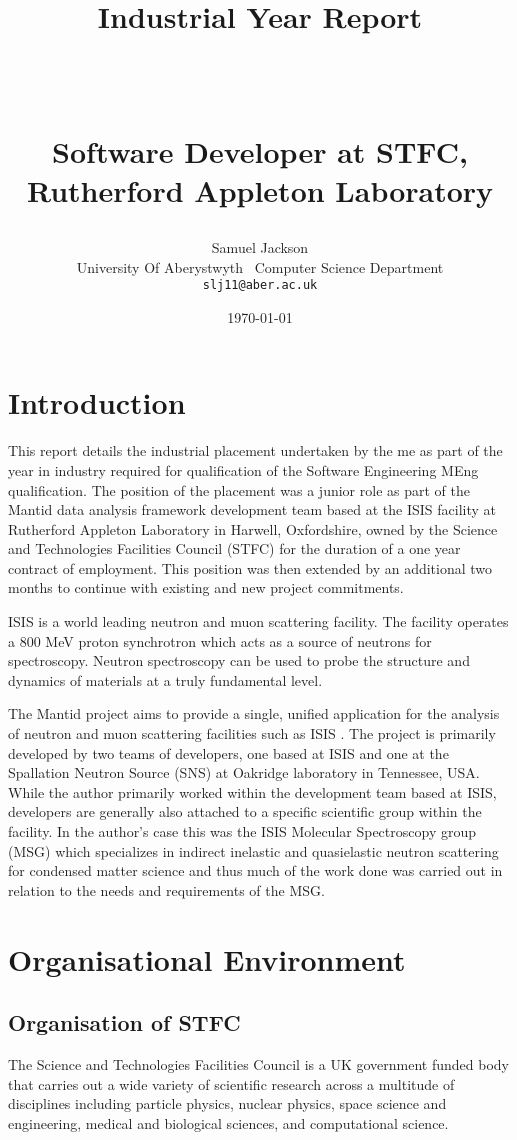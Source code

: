 \documentclass[paper=a4, fontsize=11pt]{scrartcl}	%
\title{ \vspace{-1in} 	\usefont{OT1}{bch}{b}{n}
		\huge \strut Industrial Year Report\strut \\
		\Large \bfseries \strut Software Developer at STFC,  Rutherford Appleton Laboratory \strut
}
\author{ 									\usefont{OT1}{bch}{m}{n}
        Samuel Jackson\\		\usefont{OT1}{bch}{m}{n}
		University Of Aberystwyth\	\usefont{OT1}{bch}{m}{n}
        Computer Science Department\\
        \texttt{slj11@aber.ac.uk}
}
\date{\today}
\numberwithin{equation}{section}															%
\numberwithin{figure}{section}																%
\numberwithin{table}{section}																%
\begin{document}
\maketitle
\clearpage
\tableofcontents
\clearpage
\section{Introduction}
This report details the industrial placement undertaken by the me as part of the year in industry required for qualification of the Software Engineering MEng qualification. The position of the placement was a junior role as part of the Mantid data analysis framework development team based at the ISIS facility at Rutherford Appleton Laboratory in Harwell, Oxfordshire, owned by the Science and Technologies Facilities Council (STFC) for the duration of a one year contract of employment. This position was then extended by an additional two months to continue with existing and new project commitments.

ISIS is a world leading neutron and muon scattering facility. The facility operates a 800 MeV proton synchrotron which acts as a source of neutrons for spectroscopy\cite{website:isis-website}. Neutron spectroscopy can be used to probe the structure and dynamics of materials at a truly fundamental level.

The Mantid project aims to provide a single, unified application for the analysis of neutron and muon scattering facilities such as ISIS \cite{website:mantid-website}. The project is primarily developed by two teams of developers, one based at ISIS and one at the Spallation Neutron Source (SNS) at Oakridge laboratory in Tennessee, USA. While the author primarily worked within the development team based at ISIS, developers are generally also attached to a specific scientific group within the facility. In the author's case this was the ISIS Molecular Spectroscopy group (MSG) which specializes in indirect inelastic and quasielastic neutron scattering for condensed matter science \cite{website:msg-website} and thus much of the work done was carried out in relation to the needs and requirements of the MSG.

\section{Organisational Environment}
\subsection{Organisation of STFC}
The Science and Technologies Facilities Council is a UK government funded body that carries out a wide variety of scientific research across a multitude of disciplines including particle physics, nuclear physics, space science and engineering, medical and biological sciences, and computational science. 
\end{document}
